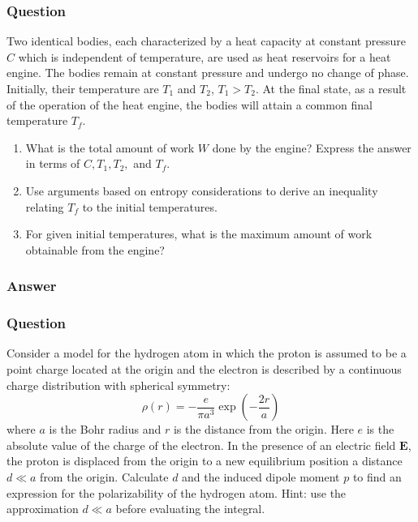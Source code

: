 \subsubsection{Question}
Two identical bodies, each characterized by a heat capacity at constant pressure $C$ which is independent of temperature, are used as heat reservoirs for a heat engine. The bodies remain at constant pressure and undergo no change of phase. Initially, their temperature are $T_1$ and $T_2$, $T_1 > T_2$. At the final state, as a result of the operation of the heat engine, the bodies will attain a common final temperature $T_f$.
\begin{enumerate}
	\item What is the total amount of work $W$ done by the engine? Express the answer in terms of $C,T_1,T_2,$ and $T_f.$
	\item Use arguments based on entropy considerations to derive an inequality relating $T_f$ to the initial temperatures.
	\item For given initial temperatures, what is the maximum amount of work obtainable from the engine?
\end{enumerate}
\subsubsection{Answer}



\subsubsection{Question}
	Consider a model for the hydrogen atom in which the proton is assumed to be a point charge located at the origin and the electron is described by a continuous charge distribution with spherical symmetry:
	\begin{equation}
		\rho(r) = -\frac{e}{\pi a^3}\exp(-\frac{2r}{a})
	\end{equation}
	where $a$ is the Bohr radius and $r$ is the distance from the origin. Here $e$ is the absolute value of the charge of the electron. In the presence of an electric field $\mathbf{E}$, the proton is displaced from the origin to a new equilibrium position a distance $d\ll a$ from the origin. Calculate $d$ and the induced dipole moment $p$ to find an expression for the polarizability of the hydrogen atom. Hint: use the approximation $d\ll a$ before evaluating the integral.

